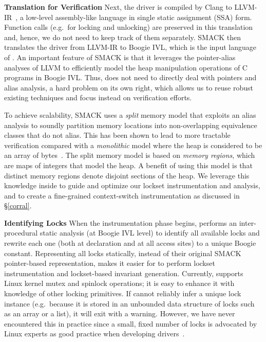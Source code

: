 \noindent\textbf{Translation for Verification }
%
Next, the driver is compiled by Clang to LLVM-IR~\cite{lattner2004llvm}, a low-level assembly-like language in single static assignment (SSA) form. Function calls (e.g.\ for locking and unlocking) are preserved in this translation and, hence, we do not need to keep track of them separately.
%
SMACK then translates the driver from LLVM-IR to Boogie IVL, which is the input language of \whoop. An important feature of SMACK is that it leverages the pointer-alias analyses of LLVM to efficiently model the heap manipulation operations of C programs in Boogie IVL. Thus, \whoop does not need to directly deal with pointers and alias analysis, a hard problem on its own right, which allows us to reuse robust existing techniques and focus instead on verification efforts.

To achieve scalability, SMACK uses a \emph{split} memory model that exploits an alias analysis to soundly partition memory locations into non-overlapping equivalence classes that do not alias. This has been shown to lead to more tractable verification compared with a \emph{monolithic} model where the heap is considered to be an array of bytes~\cite{rakamaric2009scalable}. The split memory model is based on \emph{memory regions}, which are maps of integers that model the heap. A benefit of using this model is that distinct memory regions denote disjoint sections of the heap. We leverage this knowledge inside \whoop to guide and optimize our lockset instrumentation and analysis, and to create a fine-grained context-switch instrumentation as discussed in \S\ref{corral}.

\noindent\textbf{Identifying Locks }
%
When the instrumentation phase begins, \whoop performs an inter-procedural static analysis (at Boogie IVL level) to identify all available locks and rewrite each one (both at declaration and at all access sites) to a unique Boogie constant. Representing all locks statically, instead of their original SMACK pointer-based representation, makes it easier for \whoop to perform lockset instrumentation and lockset-based invariant generation.
%
Currently, \whoop supports Linux kernel mutex and spinlock operations; it is easy to enhance it with knowledge of other locking primitives.
%
If \whoop cannot reliably infer a unique lock instance (e.g.\ because it is stored in an unbounded data structure of locks such as an array or a list), it will exit with a warning. However, we have never encountered this in practice since a small, fixed number of locks is advocated by Linux experts as good practice when developing drivers~\cite[p.\ 123]{corbet2005linux}.

